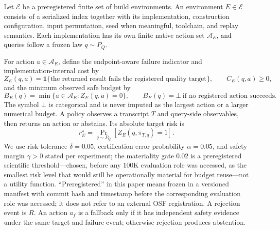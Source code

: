 \documentclass{article}
\renewcommand{\Pr}{\mathop{\mathrm{Pr}}}   %
\newcommand{\Acal}{\mathcal{A}}
\newcommand{\Ecal}{\mathcal{E}}
\newcommand{\BOT}{\bot}
\begin{document}
\label{sec:formulation}

Let $\Ecal$ be a preregistered finite set of build environments. An environment $E\in\Ecal$ consists of a
serialized index together with its implementation, construction configuration, input permutation, seed when
meaningful, toolchain, and replay semantics. Each implementation has its own finite native action set
$\Acal_E$, and queries follow a frozen law $q\sim P_Q$.

For action $a\in\Acal_E$, define the endpoint-aware failure indicator and implementation-internal cost by
\begin{equation}
Z_{E}(q,a)=\mathbf{1}\{\text{the returned result fails the registered quality target}\},\qquad
C_{E}(q,a)\ge 0,
\label{eq:zc}
\end{equation}
and the minimum observed safe budget by
\begin{equation}
B_{E}(q)=\min\{a\in\Acal_{E}:Z_{E}(q,a)=0\},\qquad
B_{E}(q)=\BOT\ \text{if no registered action succeeds}.
\label{eq:bmin}
\end{equation}
The symbol $\BOT$ is categorical and is never imputed as the largest action or a larger numerical budget. A
policy observes a transcript $T$ and query-side observables, then returns an action or abstains. Its
absolute target risk is
\begin{equation}
r_{E}^{\pi}=\Pr_{q\sim P_{Q}}\!\left[Z_{E}(q,\pi_{T,q})=1\right].
\label{eq:risk}
\end{equation}
We use risk tolerance $\delta=0.05$, certification error probability $\alpha=0.05$, and safety margin
$\gamma>0$ stated per experiment; the materiality gate $0.02$ is a preregistered scientific threshold---chosen, before any 100K evaluation
role was accessed, as the smallest risk level that would still be operationally material for budget
reuse---not a utility function. ``Preregistered'' in this paper means frozen in a versioned manifest with commit hash and
timestamp before the corresponding evaluation role was accessed; it does not refer to an external OSF
registration. A rejection event is $R$. An action $a_f$ is a fallback only if it has independent safety
evidence under the same target and failure event; otherwise rejection produces abstention.
\end{document}
